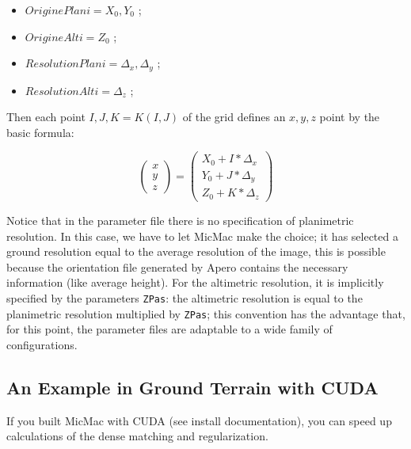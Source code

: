 \begin{itemize}
   \item  $OriginePlani=X_0,Y_0$  ;
   \item  $OrigineAlti=Z_0$       ;

   \item  $ResolutionPlani=\Delta_x,\Delta_y$       ;
   \item  $ResolutionAlti=\Delta_z$       ;
\end{itemize}

Then each point $I,J,K=K(I,J)$ of the grid defines an $x,y,z$ point by the basic formula:


\begin{equation}
   \begin{pmatrix}  x \\ y \\ z \end{pmatrix}
   = \begin{pmatrix}  X_0 + I * \Delta_x \\ Y_0 + J * \Delta_y \\ Z_0 + K * \Delta_z \end{pmatrix}
\end{equation}

Notice that in the parameter file there is no specification of planimetric resolution.
In this case, we have to let MicMac make the choice; it has selected a ground resolution
equal to the average resolution of the image, this is possible because the orientation
file generated by Apero contains the necessary information (like average height).
For the altimetric resolution, it is implicitly specified by the parameters
{\tt ZPas}: the altimetric resolution is equal to the  planimetric resolution
multiplied by {\tt ZPas}; this convention has the advantage that, for this point, the parameter
files are adaptable to a wide family of configurations.


\subsection{An Example in Ground Terrain with CUDA}

If you built MicMac with CUDA (see install documentation), you can speed up calculations of the dense matching and regularization.

